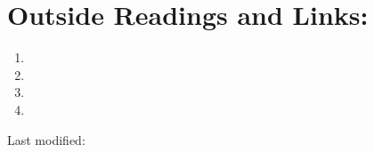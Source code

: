 \documentclass[12pt]{article}
\begin{document}



\hr

\section*{Outside Readings and Links:}
\begin{enumerate}
    \item
    \item
    \item
    \item
\end{enumerate}

\hr

\mydisclaim \myfooter

Last modified:  \flastmod
\end{document}
